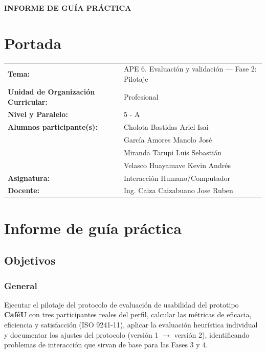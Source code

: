 \documentclass{article}
\begin{document}
\begin{center}
    {\large \textbf{INFORME DE GUÍA PRÁCTICA}} \\
\end{center}

\section{Portada}
\begin{flushleft}
\begin{tabular}{ l p{9cm} }
    \textbf{Tema:} & APE 6. Evaluación y validación — Fase 2: Pilotaje \\
    \textbf{Unidad de Organización Curricular:} & Profesional \\
    \textbf{Nivel y Paralelo:} & 5 - A \\
    \textbf{Alumnos participante(s):} & Cholota Bastidas Ariel Isai \\
                                      & García Amores Manolo José \\
                                      & Miranda Tarupi Luis Sebastián \\
                                      & Velasco Huayamave Kevin Andrés \\
    \textbf{Asignatura:} & Interacción Humano/Computador \\
    \textbf{Docente:} & Ing. Caiza Caizabuano Jose Ruben \\
\end{tabular}
\end{flushleft}

\section{Informe de guía práctica}

\subsection{Objetivos}
\subsubsection{General}
Ejecutar el pilotaje del protocolo de evaluación de usabilidad del prototipo \textbf{CaféU} con tres participantes reales del perfil, calcular las métricas de eficacia, eficiencia y satisfacción (ISO 9241-11), aplicar la evaluación heurística individual y documentar los ajustes del protocolo (versión 1 $\rightarrow$ versión 2), identificando problemas de interacción que sirvan de base para las Fases 3 y 4.
\end{document}
